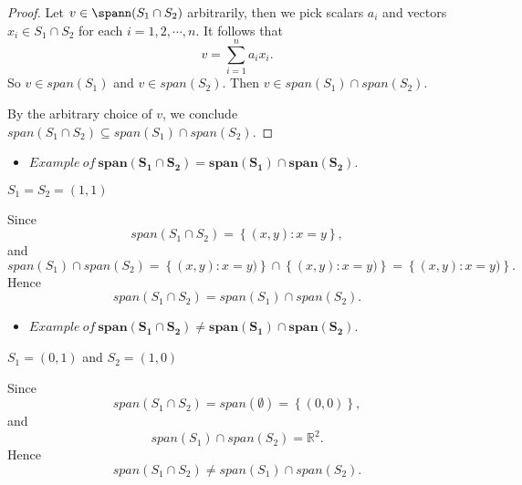 \begin{Exercise}
	\begin{proof}
		Let $v\in \spann(S_1\cap S_2)$ arbitrarily, then we pick scalars $a_i$ and vectors $x_i\in S_1\cap S_2$ for each $i=1,2,\cdots,n$. It follows that
		$$
		v = \sum_{i=1}^{n} a_i x_i.
		$$
		So $v\in span(S_1)$ and $v\in span(S_2)$. Then $v\in span(S_1)\cap span(S_2)$.
		
		By the arbitrary choice of $v$, we conclude $span(S_1\cap S_2) \subseteq span(S_1)\cap span(S_2)$.
	\end{proof}
	\begin{itemize}
		\item $Example\ of\ \mathbf{span(S_1\cap S_2) = span(S_1)\cap span(S_2)}$.
	\end{itemize}
	\begin{answer}
		$S_1 = S_2 = (1,1)$
	\end{answer}
	\begin{solution}
		Since
		$$
		span(S_1\cap S_2) = \left\{ (x,y):x=y \right\},
		$$
		and
		$$
		span(S_1)\cap span(S_2) = \left\{ (x,y):x=y) \right\} \cap \left\{ (x,y):x=y) \right\} = \left\{ (x,y):x=y) \right\}.
		$$
		Hence 
		$$
		span(S_1\cap S_2) = span(S_1)\cap span(S_2).
		$$
	\end{solution}
	
	\begin{itemize}
		\item $Example\ of\ \mathbf{span(S_1\cap S_2) \neq span(S_1)\cap span(S_2)}$.
	\end{itemize}
	\begin{answer}
		$S_1 = (0,1)$ and $S_2 = (1,0)$
	\end{answer}
	\begin{solution}
		Since
		$$
		span(S_1\cap S_2) = span(\emptyset) = \left\{ (0,0) \right\},
		$$
		and
		$$
		span(S_1)\cap span(S_2) = \mathbb{R}^2.
		$$
		Hence 
		$$
		span(S_1\cap S_2) \neq span(S_1)\cap span(S_2).
		$$
	\end{solution}
	
\end{Exercise}